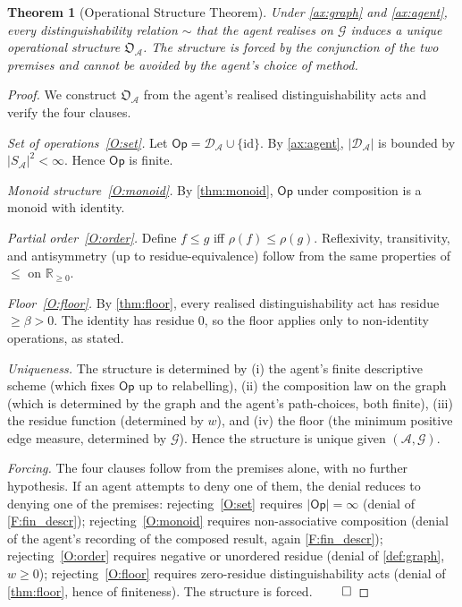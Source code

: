 \documentclass[11pt,a4paper]{article}
\theoremstyle{thmstyle}
\newtheorem{theorem}{Theorem}[section]
\theoremstyle{definition}
\theoremstyle{remark}
\newcommand{\R}{\mathbb{R}}
\newcommand{\Graph}{\mathcal{G}}
\newcommand{\Agent}{\mathcal{A}}
\newcommand{\Op}{\mathsf{Op}}
\newcommand{\Res}{\rho}
\newcommand{\floor}{\beta}
\newcommand{\OpStr}{\mathfrak{O}}
\begin{document}
\begin{theorem}[Operational Structure Theorem]
\label{thm:opstructure}
Under \cref{ax:graph} and \cref{ax:agent}, every distinguishability
relation $\sim$ that the agent realises on $\Graph$ induces a
unique operational structure $\OpStr_\Agent$. The structure is
forced by the conjunction of the two premises and cannot be avoided
by the agent's choice of method.
\end{theorem}

\begin{proof}
We construct $\OpStr_\Agent$ from the agent's realised
distinguishability acts and verify the four clauses.

\emph{Set of operations~\ref{O:set}.} Let $\Op = \mathcal{D}_\Agent
\cup \{\mathrm{id}\}$. By \cref{ax:agent},
$|\mathcal{D}_\Agent|$ is bounded by $|S_\Agent|^2 < \infty$.
Hence $\Op$ is finite.

\emph{Monoid structure~\ref{O:monoid}.} By \cref{thm:monoid},
$\Op$ under composition is a monoid with identity.

\emph{Partial order~\ref{O:order}.} Define $f \leq g$ iff
$\Res(f) \leq \Res(g)$. Reflexivity, transitivity, and antisymmetry
(up to residue-equivalence) follow from the same properties of
$\leq$ on $\R_{\geq 0}$.

\emph{Floor~\ref{O:floor}.} By \cref{thm:floor}, every realised
distinguishability act has residue $\geq \floor > 0$. The identity
has residue $0$, so the floor applies only to non-identity
operations, as stated.

\emph{Uniqueness.} The structure is determined by (i) the agent's
finite descriptive scheme (which fixes $\Op$ up to relabelling),
(ii) the composition law on the graph (which is determined by the
graph and the agent's path-choices, both finite), (iii) the
residue function (determined by $w$), and (iv) the floor (the
minimum positive edge measure, determined by $\Graph$). Hence the
structure is unique given $(\Agent, \Graph)$.

\emph{Forcing.} The four clauses follow from the premises alone,
with no further hypothesis. If an agent attempts to deny one of
them, the denial reduces to denying one of the premises:
rejecting~\ref{O:set} requires $|\Op| = \infty$ (denial of
\ref{F:fin_descr}); rejecting~\ref{O:monoid} requires
non-associative composition (denial of the agent's recording of the
composed result, again \ref{F:fin_descr});
rejecting~\ref{O:order} requires negative or unordered residue
(denial of \cref{def:graph}, $w \geq 0$); rejecting~\ref{O:floor}
requires zero-residue distinguishability acts (denial of
\cref{thm:floor}, hence of finiteness). The structure is forced.
$\qed$
\end{proof}
\end{document}
